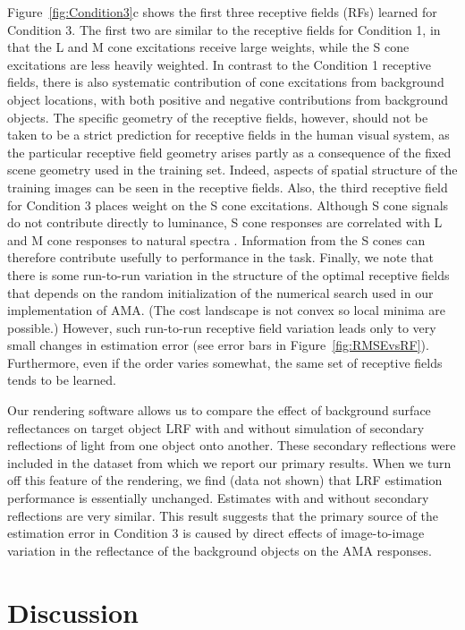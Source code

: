 \documentclass{jov}
\begin{document}
Figure~\ref{fig:Condition3}c shows the first three receptive fields (RFs) learned for Condition 3.
The first two are similar to the receptive fields for Condition 1, in that the L and M cone excitations receive large weights, while the S cone excitations are less heavily weighted.
In contrast to the Condition 1 receptive fields, there is also systematic contribution of cone excitations from background object locations, with both positive and negative contributions from background objects. 
The specific geometry of the receptive fields, however, should not be taken to be a strict prediction for receptive fields in the human visual system, as the particular receptive field geometry arises partly as a consequence of the fixed scene geometry used in the training set. 
Indeed, aspects of spatial structure of the training images can be seen in the receptive fields. 
Also, the third receptive field for Condition 3 places weight on the S cone excitations.
Although S cone signals do not contribute directly to luminance,  S cone responses are correlated with
L and M cone responses to natural spectra \cite{burton1987color, benson2014unsupervised}.
Information from the S cones can therefore contribute usefully to performance in the task. 
Finally, we note that there is some run-to-run variation in the structure of the optimal receptive fields that depends on the random initialization of the numerical search used in our implementation of AMA. 
(The cost landscape is not convex so local minima are possible.) 
However, such run-to-run receptive field variation leads only to very small changes in estimation error (see error bars in Figure~\ref{fig:RMSEvsRF}). 
Furthermore, even if the order varies somewhat, the same set of receptive fields tends to be learned.

Our rendering software allows us to compare the effect of background surface reflectances on target object LRF with and without simulation of secondary reflections of light from one object onto another. 
These secondary reflections were included in the dataset from which we report our primary results. 
When we turn off this feature of the rendering, we find (data not shown) that LRF estimation performance is essentially unchanged. 
Estimates with and without secondary reflections are very similar. 
This result suggests that the primary source of the estimation error in Condition 3 is caused by direct effects of image-to-image variation in the reflectance of the background objects on the AMA responses.

\section{Discussion} \label{Discussion}
\end{document}
